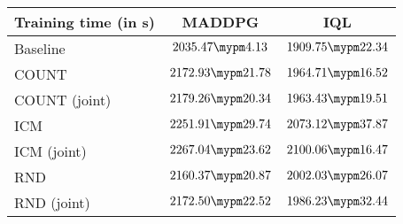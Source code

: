 \begin{tabular}{l | c c}
	Training time (in s) & MADDPG & IQL\\ \toprule
		Baseline & $2035.47 \mypm 4.13$ & $1909.75 \mypm 22.34$ \\ \midrule
	COUNT & $2172.93 \mypm 21.78$ & $1964.71 \mypm 16.52$ \\
	COUNT (joint) & $2179.26 \mypm 20.34$ & $1963.43 \mypm 19.51$ \\\midrule
	ICM & $2251.91 \mypm 29.74$ & $2073.12 \mypm 37.87$ \\
	ICM (joint) & $2267.04 \mypm 23.62$ & $2100.06 \mypm 16.47$ \\\midrule
	RND & $2160.37 \mypm 20.87$ & $2002.03 \mypm 26.07$ \\
	RND (joint) & $2172.50 \mypm 22.52$ & $1986.23 \mypm 32.44$ \\\midrule
\end{tabular}
